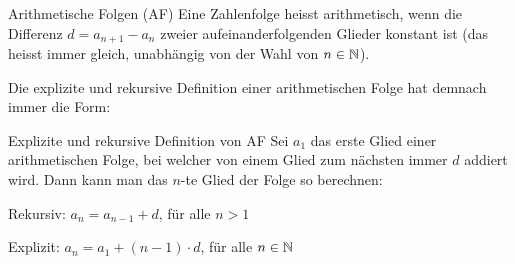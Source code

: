 \begin{definition} {Arithmetische Folgen (AF)} {}
    Eine Zahlenfolge heisst arithmetisch, wenn die Differenz $d=a_{n+1}-a_n$ zweier aufeinanderfolgenden Glieder konstant ist
    (das heisst immer gleich, unabhängig von der Wahl von $n\in \mathbb{N}$).
\end{definition}
Die explizite und rekursive Definition einer arithmetischen Folge hat demnach immer die Form:

\begin{satz} {Explizite und rekursive Definition von AF}{}
    Sei $a_1$ das erste Glied einer arithmetischen Folge, bei welcher von einem Glied zum nächsten immer $d$ addiert wird. Dann kann man das $n$-te Glied der Folge so berechnen:
    
Rekursiv: $a_n=a_{n-1}+d$, für alle $n>1$

Explizit: $a_n=a_1+(n-1)\cdot d$, für alle $n\in \mathbb{N}$
\end{satz}

